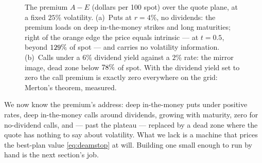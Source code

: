 \begin{figure}[htbp]
\centering
{}
\caption{The premium $A-E$ (dollars per 100 spot) over the quote
plane, at a fixed $25\%$ volatility.  (a)~Puts at $r=4\%$, no
dividends: the premium loads on deep in-the-money strikes and long
maturities; right of the orange edge the price equals intrinsic ---
at $t=0.5$, beyond $129\%$ of spot --- and carries
no volatility information.  (b)~Calls under a $6\%$ dividend yield
against a $2\%$ rate: the mirror image, dead zone below
$78\%$ of spot.  With the dividend yield set to
zero the call premium is exactly zero everywhere on the grid:
Merton's theorem, measured.}
\label{fig:deammap}
\end{figure}

We now know the premium's address: deep in-the-money puts under
positive rates, deep in-the-money calls around dividends, growing
with maturity, zero for no-dividend calls, and --- past the plateau
--- replaced by a dead zone where the quote has nothing to say about
volatility.  What we lack is a machine that prices the best-plan value
\eqref{eq:deamstop} at will.  Building one small enough to run by
hand is the next section's job.
